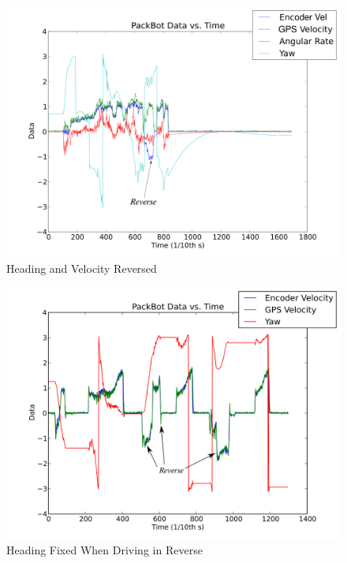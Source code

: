 \begin{figure}[ht!]
	\centering
	\includegraphics[width=.7\textwidth]{images/pbDataReverseHeading}
	\caption{Heading and Velocity Reversed}
	\label{fig:pbDataReverseHeadingBroken}
\end{figure}

\begin{figure}[ht!]
	\centering
	\includegraphics[width=.7\textwidth]{images/KFDataHeadingReverseFixed}
	\caption{Heading Fixed When Driving in Reverse}
	\label{fig:pbDataReverseHeadingFixed}
\end{figure}

%
%

